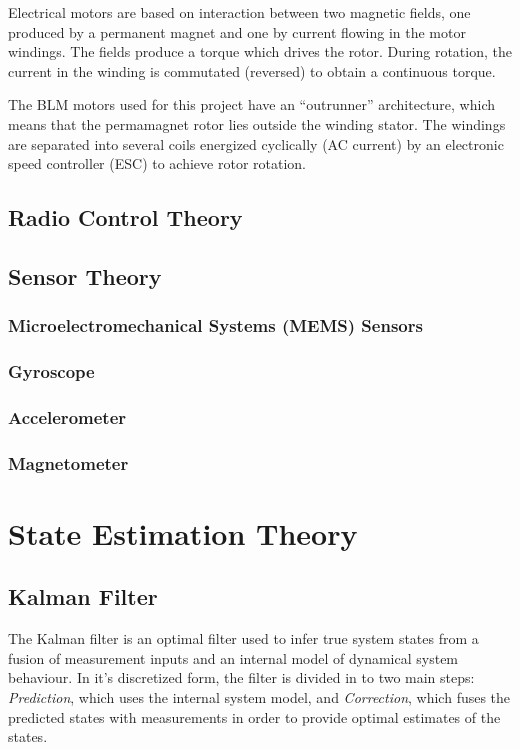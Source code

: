 \documentclass[a4paper]{report}
\begin{document}
Electrical motors are based on interaction between two magnetic fields, one produced by a permanent magnet and one by current flowing in the motor windings. The fields produce a torque which drives the rotor. During rotation, the current in the winding is commutated (reversed) to obtain a continuous torque.

The BLM motors used for this project have an “outrunner” architecture, which means that the permamagnet rotor lies outside the winding stator. The windings are separated into several coils energized cyclically (AC current) by an electronic speed controller (ESC) to achieve rotor rotation.

	\section{Radio Control Theory}

	\section{Sensor Theory}

		\subsection{Microelectromechanical Systems (MEMS) Sensors}

		\subsection{Gyroscope}

		\subsection{Accelerometer}

		\subsection{Magnetometer}

\chapter{State Estimation Theory}
\label{chap:state-estimation-theory}

	\section{Kalman Filter}
The Kalman filter is an optimal filter used to infer true system states from a fusion of measurement inputs and an internal model of dynamical system behaviour. In it's discretized form, the filter is divided in to two main steps: \emph{Prediction}, which uses the internal system model, and \emph{Correction}, which fuses the predicted states with measurements in order to provide optimal estimates of the states.
\end{document}
